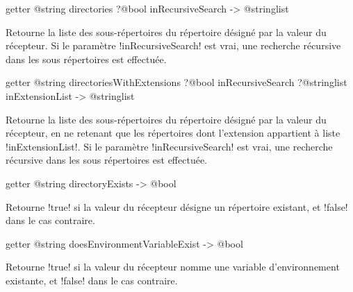 
\begin{galgasbox}
getter @string directories ?@bool inRecursiveSearch -> @stringlist
\end{galgasbox}

Retourne la liste des sous-répertoires du répertoire désigné par la valeur du récepteur. Si le paramètre \ggs!inRecursiveSearch! est vrai, une recherche récursive dans les sous répertoires est effectuée.










\begin{galgasbox}
getter @string directoriesWithExtensions
    ?@bool inRecursiveSearch
    ?@stringlist inExtensionList -> @stringlist
\end{galgasbox}

Retourne la liste des sous-répertoires du répertoire désigné par la valeur du récepteur, en ne retenant que les répertoires dont l'extension appartient à liste \ggs!inExtensionList!. Si le paramètre \ggs!inRecursiveSearch! est vrai, une recherche récursive dans les sous répertoires est effectuée.









\begin{galgasbox}
getter @string directoryExists -> @bool
\end{galgasbox}

Retourne \ggs!true! si la valeur du récepteur désigne un répertoire existant, et \ggs!false! dans le cas contraire.









\begin{galgasbox}
getter @string doesEnvironmentVariableExist -> @bool
\end{galgasbox}

Retourne \ggs!true! si la valeur du récepteur nomme une variable d'environnement existante, et \ggs!false! dans le cas contraire.








